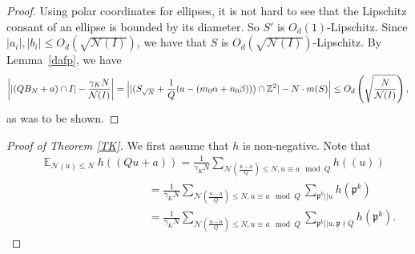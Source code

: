 \documentclass[11pt]{amsart}
\theoremstyle{definition}
\DeclareMathOperator*{\E}{\mathbb{E}}
\newcommand{\NN}{{\mathcal N}}
\newcommand{\Z}{{\mathbb Z}}
\newcommand{\mf}{\mathfrak}
\newcommand{\FM}[1]{{\color{violet}{{#1}}}}
\newcommand{\WS}[1]{{\color{blue}{{#1}}}}
\begin{document}
\begin{proof}
      
       Using polar coordinates for ellipses, it is not hard to see that the Lipschitz consant of an ellipse is bounded by its diameter. So $S'$ is $O_{d}(1)$-Lipschitz. Since $\vert a_{i}\vert, \vert b_{i}\vert\leq O_{d}(\sqrt{\NN(I)})$, we have that $S$ is $O_{d}(\sqrt{\NN(I)})$-Lipschitz. By Lemma~\ref{dafp}, we have 
      \[\left\vert\vert (QB_{N}+a)\cap I\vert-\frac{\gamma_{K}N}{\NN(I)}\right\vert=\Bigl\vert\vert (S_{\sqrt{N}}+\frac{1}{Q}(a-(m_{0}\alpha+n_{0}\beta)))\cap \Z^{2}\vert-N\cdot m(S)\Bigr\vert\leq O_{d}\left(\sqrt{\frac{N}{\NN(I)}}\right),\]
      as was to be shown.
\end{proof}

 
\begin{proof}[Proof of Theorem \ref{TK}]
We first assume that $h$ is non-negative.
 Note that
\begin{equation}\label{firstTK}
    \begin{split}
        &\quad \E_{\NN(u) \leq N}h((Qu+a))
        =\frac{1}{\gamma_{K} N}\sum_{\NN(\frac{u-a}{Q})\leq N, u\equiv a \mod Q}h((u))
        \\&\quad\quad\quad\quad\quad\quad\quad\quad\quad\quad\;\;=\frac{1}{\gamma_{K} N}\sum_{\NN(\frac{u-a}{Q})\leq N, u\equiv a \mod Q}\sum_{\mf p^{k}|| u} h(\mf p^{k})
        \\&\quad\quad\quad\quad\quad\quad\quad\quad\quad\quad\;\;=\frac{1}{\gamma_{K} N}\sum_{\NN(\frac{u-a}{Q})\leq N, u\equiv a \mod Q}\sum_{\mf p^{k}|| u, \mf p\nmid Q} h(\mf p^{k}).

\end{split}
\end{equation}
\end{proof}
\end{document}
